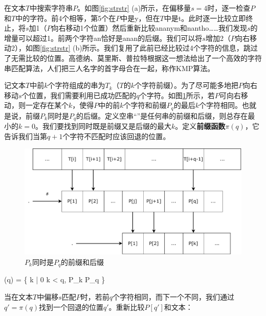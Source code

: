 \documentclass[b5paper]{ctexart}
\begin{document}
 

在文本$T$中搜索字符串$P$。如图\ref{fig:strstr} (a)所示，在偏移量$s=4$时，逐一检查$P$和$T$中的字符。前4个相等，第5个在$P$中是y，但在$T$中是t。此时逐一比较立即终止，将$s$加1（$P$向右移动1个位置）然后重新比较ananym和nantho……我们发现$s$的增量可以超过1。前两个字符an恰好是anan的后缀。我们可以将$s$增加2（$P$向右移动2），如图\ref{fig:strstr} (b)所示。我们复用了此前已经比较过4个字符的信息，跳过了无需比较的位置。高德纳、莫里斯、普拉特根据这一想法给出了一个高效的字符串匹配算法\cite{kmp}，人们把三人名字的首字母合在一起，称作KMP算法。

记文本$T$中前$k$个字符组成的串为$T_k$（$T$的$k$个字符前缀）。为了尽可能多地把$P$向右移动$s$个位置，我们需要利用已成功匹配的$q$个字符。如图\ref{fig:kmp-fallback}所示，若$P$可向右移动，则一定存在某个$k$，使得$P$中的前$k$个字符和前缀$P_q$的最后$k$个字符相同。也就是说，前缀$P_k$同时是$P_q$的后缀。定义空串“”是任何串的前缀和后缀，则总存在最小的$k=0$。我们要找到同时既是前缀又是后缀的最大$k$。定义\textbf{前缀函数}$\pi(q)$，它告诉我们当第$q+1$个字符不匹配时应该回退的位置\cite{CLRS}。

\begin{figure}[htbp]
 \centering
 \includegraphics[scale=0.5]{img/kmp-fallback}
 \caption{$P_k$同时是$P_q$的前缀和后缀}
 \label{fig:kmp-fallback}
\end{figure}

\be
\pi(q) = \max \{ k | 0 \leq k < q,  P_k  P_q \}
\label{eq:prefix-function}
\ee

当在文本$T$中偏移$s$匹配$P$时，若前$q$个字符相同，而下一个不同，我们通过$q' = \pi(q)$找到一个回退的位置$q'$。重新比较$P[q']$和文本：
\end{document}
